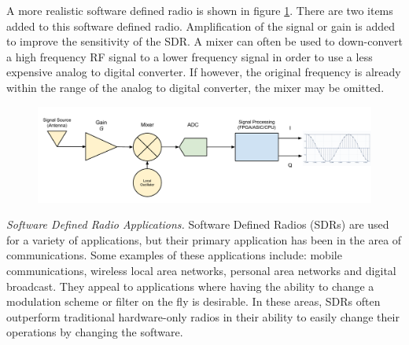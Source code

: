 A more realistic software defined radio is shown in figure \ref{prac_sdr}.  There are two items added to this software defined radio.  Amplification of the signal or gain is added to improve the sensitivity of the SDR.  A mixer can often be used to down-convert a high frequency RF signal to a lower frequency signal in order to use a less expensive analog to digital converter.  If however, the original frequency is already within the range of the analog to digital converter, the mixer may be omitted.  


{\begin{figure}[h!tb] 
\centering
\includegraphics[width=\textwidth]{Images/SDR_Prac_block.pdf}
\label{prac_sdr}
\end{figure}
}

\emph{Software Defined Radio Applications.}  Software Defined Radios (SDRs) are used for a variety of applications, but their primary application has been in the area of communications.  Some examples of these applications include:  mobile communications, wireless local area networks, personal area networks and digital broadcast.  They appeal to applications where having the ability to change a modulation scheme or filter on the fly is desirable.  In these areas, SDRs often outperform traditional hardware-only radios in their ability to easily change their operations by changing the software.  

